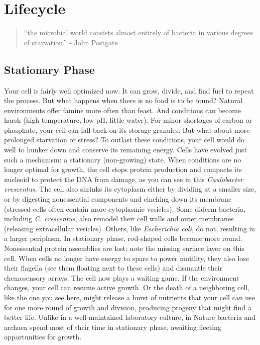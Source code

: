 \documentclass[]{tufte-book}
\begin{document}
\hypertarget{lifecycle}{%
\chapter{Lifecycle}\label{lifecycle}}

\begin{quote}
``the microbial world consists almost entirely of bacteria in various degrees of starvation.''
- John Postgate \citep{postgate1994}
\end{quote}

\hypertarget{stationary-phase}{%
\section{Stationary Phase}\label{stationary-phase}}

Your cell is fairly well optimized now. It can grow, divide, and find fuel to repeat the process. But what happens when there is no food is to be found? Natural environments offer famine more often than feast. And conditions can become harsh (high temperature, low pH, little water). For minor shortages of carbon or phosphate, your cell can fall back on its storage granules. But what about more prolonged starvation or stress? To outlast these conditions, your cell would do well to hunker down and conserve its remaining energy. Cells have evolved just such a mechanism: a stationary (non-growing) state. When conditions are no longer optimal for growth, the cell stops protein production and compacts its nucleoid to protect the DNA from damage, as you can see in this \emph{Caulobacter crescentus}. The cell also shrinks its cytoplasm either by dividing at a smaller size, or by digesting nonessential components and cinching down its membrane (stressed cells often contain more cytoplasmic vesicles). Some diderm bacteria, including \emph{C. crescentus}, also remodel their cell walls and outer membranes (releasing extracellular vesicles). Others, like \emph{Escherichia coli}, do not, resulting in a larger periplasm. In stationary phase, rod-shaped cells become more round. Nonessential protein assemblies are lost; note the missing surface layer on this cell. When cells no longer have energy to spare to power motility, they also lose their flagella (see them floating next to these cells) and dismantle their chemosensory arrays. The cell now plays a waiting game. If the environment changes, your cell can resume active growth. Or the death of a neighboring cell, like the one you see here, might release a burst of nutrients that your cell can use for one more round of growth and division, producing progeny that might find a better life. Unlike in a well-maintained laboratory culture, in Nature bacteria and archaea spend most of their time in stationary phase, awaiting fleeting opportunities for growth.
\end{document}
